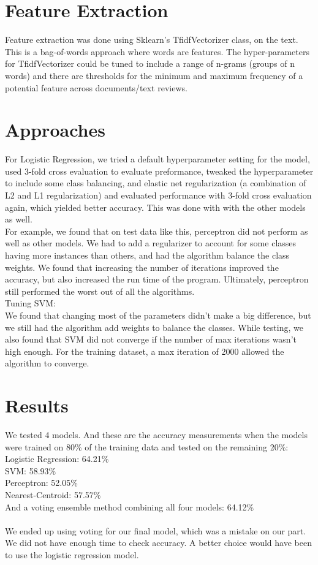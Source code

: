 \documentclass{article}
\begin{document}
\section{Feature Extraction}
Feature extraction was done using Sklearn's TfidfVectorizer class, on the text. This is a bag-of-words approach where words are features. The hyper-parameters for TfidfVectorizer could be tuned to include a range of n-grams (groups of n words) and there are thresholds for the minimum and maximum frequency of a potential feature across documents/text reviews.

\section{Approaches}
For Logistic Regression, we tried a default hyperparameter setting for the model, used 3-fold cross evaluation to evaluate preformance, tweaked the hyperparameter to include some class balancing, and elastic net regularization (a combination of L2 and L1 regularization) and evaluated performance with 3-fold cross evaluation again, which yielded better accuracy. This was done with with the other models as well.\\

For example, we found that on test data like this, perceptron did not perform as well as other models. We had to add a regularizer to account for some classes having more instances than others, and had the algorithm balance the class weights. We found that increasing the number of iterations improved the accuracy, but also increased the run time of the program. Ultimately, perceptron still performed the worst out of all the algorithms. \\

Tuning SVM:\\
We found that changing most of the parameters didn’t make a big difference, but we still had the algorithm add weights to balance the classes. While testing, we also found that SVM did not converge if the number of max iterations wasn’t high enough. For the training dataset, a max iteration of 2000 allowed the algorithm to converge.

\section{Results}
We tested 4 models. And these are the accuracy measurements when the models were trained on 80\% of the training data and tested on the remaining 20\%:\\
Logistic Regression: 64.21\%\\
SVM: 58.93\%\\
Perceptron: 52.05\%\\
Nearest-Centroid: 57.57\%\\
And a voting ensemble method combining all four models: 64.12\%\\
\\We ended up using voting for our final model, which was a mistake on our part. We did not have enough time to check accuracy. A better choice would have been to use the logistic regression model.
\end{document}
